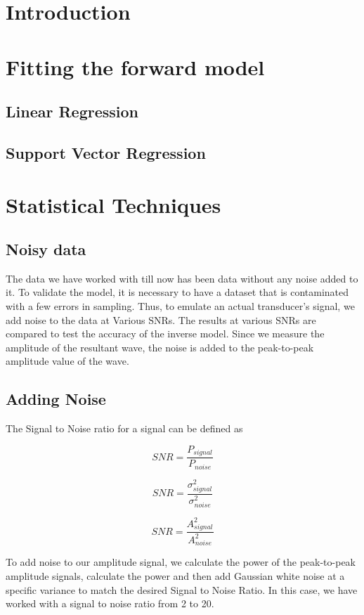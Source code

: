 \section{Introduction}
\section{Fitting the forward model}

\subsection{Linear Regression}
\subsection{Support Vector Regression}
\section{Statistical Techniques}
\subsection{Noisy data}
The data we have worked with till now has been data without any noise added to it. To validate the model, it is necessary to have a dataset that is contaminated with a few errors in sampling. Thus, to emulate an actual transducer's signal, we add noise to the data at Various SNRs. The results at various SNRs are compared to test the accuracy of the inverse model. Since we measure the amplitude of the resultant wave, the noise is added to the peak-to-peak amplitude value of the wave. 
\subsection{Adding Noise}
The Signal to Noise ratio for a signal can be defined as 

\begin{equation}
SNR = \frac{P_{signal}}{P_{noise}}
\end{equation}

\begin{equation}
SNR = \frac{\sigma^2_{signal}}{\sigma^2_{noise}}
\end{equation}

\begin{equation}
SNR = \frac{A^2_{signal}}{A^2_{noise}}
\end{equation}

To add noise to our amplitude signal, we calculate the power of the peak-to-peak amplitude signals, calculate the power and then add Gaussian white noise at a specific variance to match the desired Signal to Noise Ratio. In this case, we have worked with a signal to noise ratio from 2 to 20.

